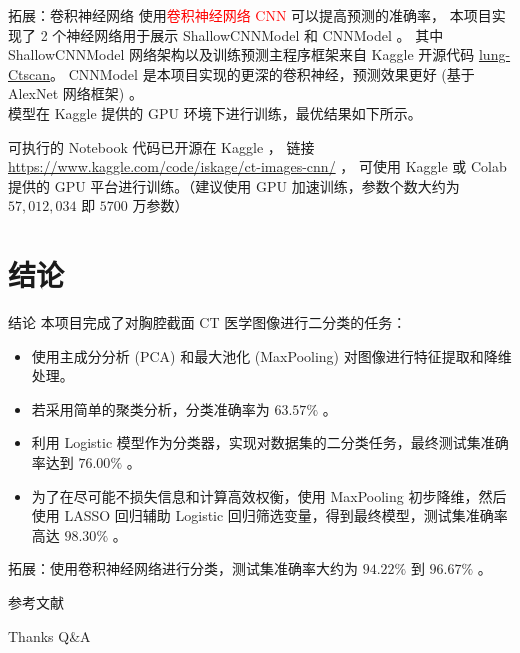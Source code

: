 \documentclass[11pt]{beamer}
\begin{document}
\begin{frame}{拓展：卷积神经网络}{}
\fontsize{9pt}{11pt}\selectfont
使用\textcolor{red}{卷积神经网络 CNN} 可以提高预测的准确率，
本项目实现了 2 个神经网络用于展示 ShallowCNNModel 和 CNNModel 。
其中 ShallowCNNModel 网络架构以及训练预测主程序框架来自 Kaggle 开源代码 
\href{https://www.kaggle.com/code/saikrishnakowshik/lung-ctscan}{lung-Ctscan}。
CNNModel 是本项目实现的更深的卷积神经，预测效果更好 (基于 AlexNet 网络框架) 。\\[0.5em]

模型在 Kaggle 提供的 GPU 环境下进行训练，最优结果如下所示。


\begin{table}
\centering
\caption{模型训练与测试表现}
\end{table}

可执行的 Notebook 代码已开源在 Kaggle ，
链接 \href{https://www.kaggle.com/code/iskage/ct-images-cnn/}{https://www.kaggle.com/code/iskage/ct-images-cnn/} ，
可使用 Kaggle 或 Colab 提供的 GPU 平台进行训练。（建议使用 GPU 加速训练，参数个数大约为 $57,012,034$ 即 $5700$ 万参数）

\end{frame}

\section{结论}

\begin{frame}{结论}{}
\fontsize{9pt}{11pt}\selectfont
本项目完成了对胸腔截面 CT 医学图像进行二分类的任务：
\begin{itemize}
  \item 使用主成分分析 (PCA) 和最大池化 (MaxPooling) 对图像进行特征提取和降维处理。
  \item 若采用简单的聚类分析，分类准确率为 $63.57\%$ 。
  \item 利用 Logistic 模型作为分类器，实现对数据集的二分类任务，最终测试集准确率达到 $76.00\%$ 。
  \item 为了在尽可能不损失信息和计算高效权衡，使用 MaxPooling 初步降维，然后使用 LASSO 回归辅助 Logistic 回归筛选变量，得到最终模型，测试集准确率高达 $98.30\%$ 。\\[1em]
\end{itemize}

\tiny{拓展：使用卷积神经网络进行分类，测试集准确率大约为 $94.22\%$ 到 $96.67\%$ 。}

\end{frame}


\begin{frame}[t]{参考文献}
  \tiny
  
\end{frame}

\begin{frame}{Thanks Q\&A}
  \titlepage
\end{frame}
\end{document}
